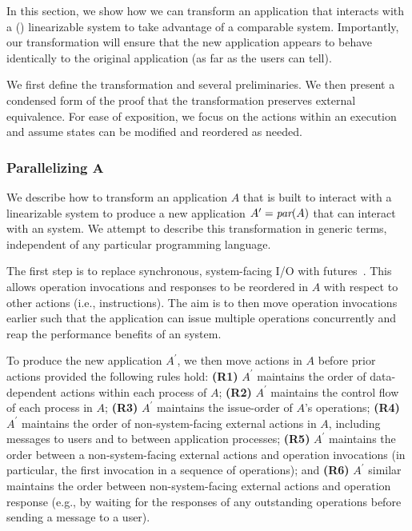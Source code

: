 In this section, we show how we can transform an application that interacts with
a (\singledispatch{}) linearizable system to take advantage of a comparable
\multidispatch{} system. Importantly, our transformation will ensure that the new
application appears to behave identically to the original application (as far as
the users can tell).

We first define the transformation and several preliminaries. We then
present a condensed form of the proof that the transformation preserves external
equivalence. For ease of exposition, we focus on the actions within an
execution and assume states can be modified and reordered as needed.

\subsubsection{Parallelizing $\mathbf{A}$}
\label{sec:mdl:transform}

We describe how to transform an application $A$ that is built to
interact with a linearizable system to produce a new application
$A^\prime = \operatorname*{\textit{par}}(A)$ that can interact with an \MDL{} system.
We attempt to describe this transformation in generic terms, independent of any particular programming language.

The first step is to replace synchronous, system-facing I/O with
futures~\cite{futures}. This allows operation invocations and responses
to be reordered in $A$ with respect to other actions (i.e., instructions).
The aim is to then move operation invocations earlier such that the application
can issue multiple operations concurrently and reap the performance benefits 
of an \MDL{} system.

To produce the new application $A^\prime$, we then move actions in $A$ before prior 
actions provided the following rules hold:
\textbf{(R1)} $A^\prime$ maintains the order of data-dependent actions within
each process of $A$;
\textbf{(R2)} $A^\prime$ maintains the control flow of each process in $A$;
\textbf{(R3)} $A^\prime$ maintains the issue-order of $A$'s operations;
\textbf{(R4)} $A^\prime$ maintains the order of non-system-facing external
actions in $A$, including messages to users and to between application processes;
\textbf{(R5)} $A^\prime$ maintains the order between a non-system-facing external 
actions and operation invocations (in particular, the first invocation in a
sequence of operations); and
\textbf{(R6)} $A^\prime$ similar maintains the order between non-system-facing external actions and operation response (e.g., by waiting for the responses of any outstanding operations before sending a message to a user).

